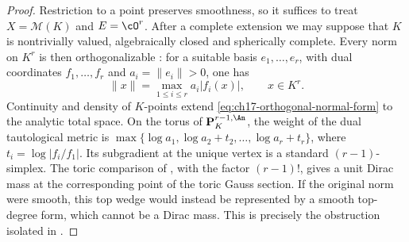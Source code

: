\begin{proof}
Restriction to a point preserves smoothness, so it suffices to treat
$X=\mathcal M(K)$ and $E=\cO^r$.  After a complete extension we may suppose
that $K$ is nontrivially valued, algebraically closed and spherically
complete.  Every norm on
$K^r$ is then orthogonalizable \cite[\S2.3]{Tem16}: for a suitable basis
$e_1,\dots,e_r$, with dual coordinates $f_1,\dots,f_r$ and
$a_i=\|e_i\|>0$, one has
\begin{equation}
\label{eq:ch17-orthogonal-normal-form}
 \|x\|=\max_{1\le i\le r}a_i|f_i(x)|,\qquad x\in K^r.
\end{equation}
Continuity and density of $K$-points extend
\eqref{eq:ch17-orthogonal-normal-form} to the analytic total space.
On the torus of $\mathbf P^{r-1,\An}_K$, the weight of the dual
tautological metric is
$\max\{\log a_1,\log a_2+t_2,\ldots,\log a_r+t_r\}$,
where $t_i=\log|f_i/f_1|$.  Its subgradient at the unique vertex is
a standard $(r-1)$-simplex.  The toric comparison of
, with the factor $(r-1)!$, gives
a unit Dirac mass at the corresponding point of the toric Gauss section.
If the original norm were smooth, this
top wedge would instead be represented by a smooth top-degree form, which
cannot be a Dirac mass.  This is precisely the obstruction isolated in
\cite[Remark~17.1.9]{CLD25}.
\end{proof}

